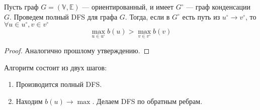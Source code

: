 \documentclass[russian]{lecture-notes}
\begin{document}
	\begin{proposition}
		Пусть граф $G = (\mathbb{V}, \mathbb{E})$ --- ориентированный, и имеет $G^\circ$ --- граф конденсации $G$. Проведем полный DFS для графа $G$. Тогда, если в $G^\circ$ есть путь из $u^\circ \to v^\circ$, то $\forall u \in u^\circ, v \in v^\circ$
		$$\max_{u \in u^\circ} {b(u)} > \max_{v \in v^\circ}{b(v)}$$
	\end{proposition}
	
	\begin{proof}
		Аналогично прошлому утверждению.
	\end{proof}
	
	\begin{corollary}
		Алгоритм состоит из двух шагов:
		\begin{enumerate}
			\item Производится полный DFS.
			\item Находим $b(u) \to \max$. Делаем DFS по обратным ребрам.
		\end{enumerate}
	\end{corollary}
	
\end{document}
